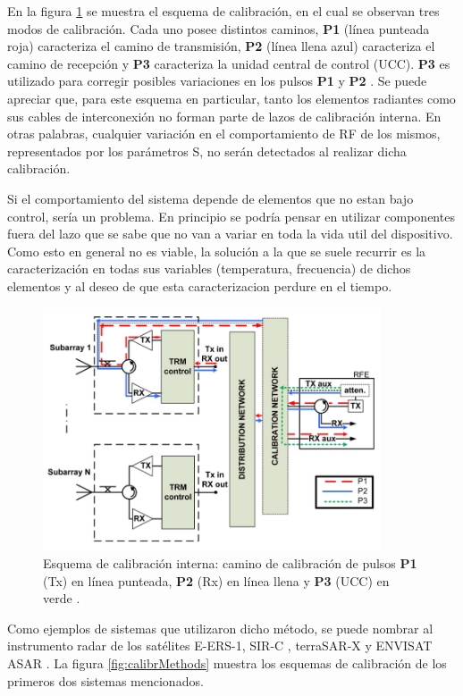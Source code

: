 En la figura \ref{fig:classic_cal_scheme} se muestra el esquema de calibración, en el cual se observan tres modos de
calibración. Cada uno posee distintos caminos, \textbf{P1} (línea punteada roja) caracteriza el camino de transmisión,
\textbf{P2} (línea llena azul) caracteriza el camino de recepción y \textbf{P3} caracteriza la unidad central de control (UCC).
\textbf{P3} es utilizado para corregir posibles variaciones en los pulsos \textbf{P1} y \textbf{P2} \cite{Makhoul2012}. Se puede
apreciar que, para este esquema en particular, tanto los elementos radiantes como sus cables de interconexión no forman parte de
lazos de calibración interna. En otras palabras, cualquier variación en el comportamiento de RF de los mismos, representados
por los parámetros S, no serán detectados al realizar dicha calibración.

Si el comportamiento del sistema depende de elementos que no estan bajo control, sería un problema. En principio se podría
pensar en utilizar componentes fuera del lazo que se sabe que no van a variar en toda la vida util del dispositivo. Como esto en
general no es viable, la solución a la que se suele recurrir es la caracterización en todas sus variables (temperatura,
frecuencia) de dichos elementos y al deseo de que esta caracterizacion perdure en el tiempo.

\begin{figure}[H]
 \centering
 \includegraphics[width=10cm]{gfx/classic_cal_scheme.png}
 \caption{Esquema de calibración interna: camino de calibración de pulsos \textbf{P1} (Tx) en línea punteada, \textbf{P2} (Rx)
 en línea llena y \textbf{P3} (UCC) en verde \cite{Makhoul2012}.}
 \label{fig:classic_cal_scheme}
\end{figure}

Como ejemplos de sistemas que utilizaron dicho método, se puede nombrar al instrumento radar de los satélites E-ERS-1, SIR-C
\cite{Curlander1991}, terraSAR-X \cite{Schwerdt2005} y ENVISAT ASAR \cite{Loop}. La figura \ref{fig:calibrMethods} muestra los esquemas
de calibración de los primeros dos sistemas mencionados.

